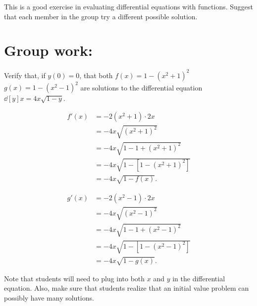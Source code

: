 \documentclass[]{ximera}
\begin{document}
\begin{instructorNotes}
This is a good exercise in evaluating differential equations with functions.  
Suggest that each member in the group try a different possible solution.
\end{instructorNotes}








\section{Group work:}












\begin{problem}
Verify that, if $y(0)=0$, that both $f(x)=1-(x^2+1)^2$  $g(x) = 1 - (x^2-1)^2$ are solutions to the differential equation $\dd[y]{x} = 4x\sqrt{1-y}$.
	\begin{freeResponse}
		\begin{align*}
		f'(x) &= -2(x^2+1) \cdot 2x  \\
		&= -4x \sqrt{(x^2+1)^2}  \\
		&= -4x \sqrt{1-1+(x^2+1)^2}  \\
		&= -4x \sqrt{1 - \left[1-(x^2+1)^2 \right]}  \\
		&= -4x \sqrt{1-f(x)}.
		\end{align*}
		
		\vskip 5pt
		
		\begin{align*}
		g'(x) &= -2(x^2-1) \cdot 2x  \\
		&= -4x \sqrt{(x^2-1)^2}  \\
		&= -4x \sqrt{1-1+(x^2-1)^2}  \\
		&= -4x \sqrt{1 - \left[1-(x^2-1)^2 \right]}  \\
		&= -4x \sqrt{1-g(x)}.
		\end{align*}
	\end{freeResponse}
		
\end{problem}

\begin{instructorNotes}
Note that students will need to plug into both $x$ and $y$ in the differential equation.  
Also, make sure that students realize that an initial value problem can possibly have many solutions.
\end{instructorNotes}
\end{document}
